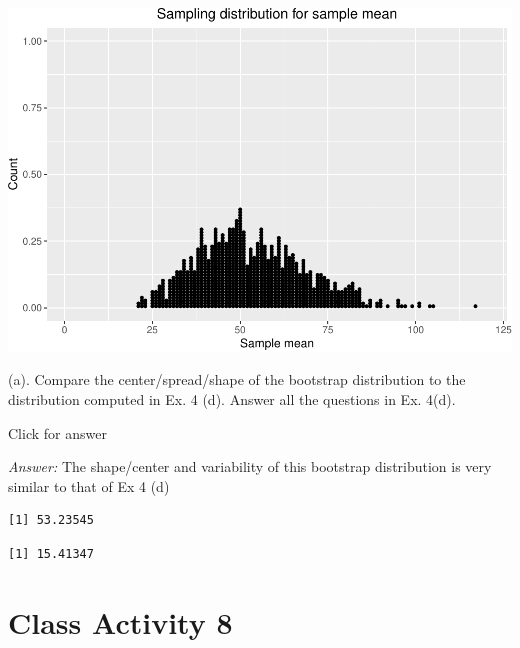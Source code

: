 \documentclass[
]{book}
\newenvironment{Shaded}{\begin{snugshade}}{\end{snugshade}}
\newcommand{\FunctionTok}[1]{\textcolor[rgb]{0.00,0.00,0.00}{#1}}
\newcommand{\NormalTok}[1]{#1}
\newcommand{\SpecialCharTok}[1]{\textcolor[rgb]{0.00,0.00,0.00}{#1}}
\begin{document}
\includegraphics[width=1\linewidth]{Class_Activity_7_files/figure-latex/unnamed-chunk-26-1}

(a). Compare the center/spread/shape of the bootstrap distribution to the distribution computed in Ex. 4 (d). Answer all the questions in Ex. 4(d).

Click for answer

\emph{Answer:} The shape/center and variability of this bootstrap distribution is very similar to that of Ex 4 (d)

\begin{Shaded}
\end{Shaded}

\begin{verbatim}
[1] 53.23545
\end{verbatim}

\begin{Shaded}
\end{Shaded}

\begin{verbatim}
[1] 15.41347
\end{verbatim}

\hypertarget{class-activity-8}{%
\chapter{Class Activity 8}\label{class-activity-8}}
\end{document}
